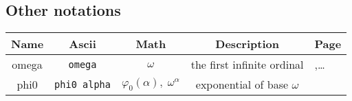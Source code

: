 \documentclass[a4paper]{book}
\begin{document}
\subsection{Other notations}

\begin{tabular}{|c|c|c|c|l|}
\hline
Name & Ascii&Math& Description& Page \\\hline
omega & \texttt{omega} & $\omega$ &   the first infinite ordinal   & \pageref{sect:notation-omega},\dots\\
phi0     & \texttt{phi0 alpha} & $\varphi_0(\alpha),\; \omega^\alpha$&exponential of base $\omega$ & \pageref{sect:notation-phi0}\\

\hline
\end{tabular}

\printindex



\end{document}
